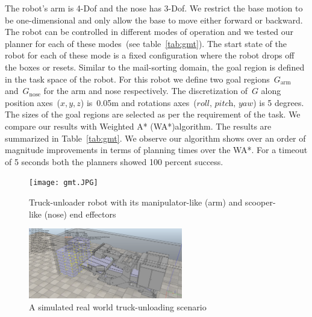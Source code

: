 \documentclass[a4paper]{report}
\begin{document}
The robot's arm is 4-Dof and the nose has 3-Dof. We restrict the base motion to be one-dimensional and only allow the base to move either forward or backward. The robot can be controlled in different modes of operation and we tested our planner for each of these modes~(see table~\ref{tab:gmt}). The start state of the robot for each of these mode is a fixed configuration where the robot drops off the boxes or resets. Similar to the mail-sorting domain, the goal region is defined in the task space of the robot. For this robot we define two goal regions~$G_{\textrm{arm}}$ and~$G_{\textrm{nose}}$ for the arm and nose respectively. The discretization of~$G$ along position axes~($x,y,z$) is~0.05m and rotations axes~($\textit{roll, pitch, yaw}$) is 5 degrees. The sizes of the goal regions are selected as per the requirement of the task.
We compare our results with Weighted A* (WA*)algorithm. The results are summarized in Table~\ref{tab:gmt}. We observe our algorithm shows over an order of magnitude improvements in terms of planning times over the WA*. For a timeout of 5 seconds both the planners showed 100 percent success.

\begin{figure}
\centering
\texttt{[image: gmt.JPG]}
  \caption{
  Truck-unloader robot with its manipulator-like (arm) and scooper-like (nose) end effectors
}
    \label{fig:gmt}
\end{figure}

\begin{figure}
\centering
\includegraphics[width=0.6\textwidth]{gmt_sim.png}
  \caption{
  A simulated real world truck-unloading scenario
}
    \label{fig:gmt_sim}
\end{figure}
\end{document}
